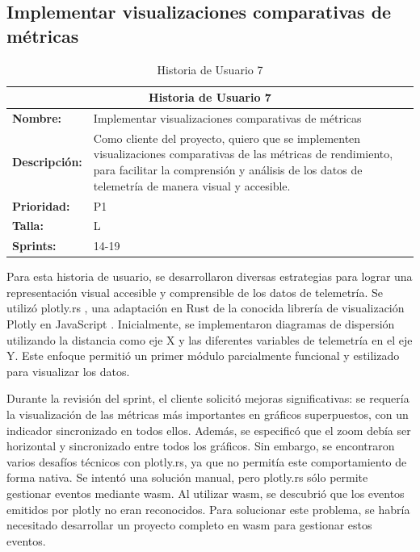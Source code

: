 \subsection{Implementar visualizaciones comparativas de métricas}
\begin{table}[H]
\centering
\begin{tabular}{|l|p{10cm}|}
\hline
\multicolumn{2}{|c|}{\textbf{Historia de Usuario 7}} \\ \hline
\textbf{Nombre:} & Implementar visualizaciones comparativas de métricas \\ \hline
\textbf{Descripción:} & Como cliente del proyecto, quiero que se implementen visualizaciones comparativas de las métricas de rendimiento, para facilitar la comprensión y análisis de los datos de telemetría de manera visual y accesible. \\ \hline
\textbf{Prioridad:} & P1 \\ \hline
\textbf{Talla:} & L \\ \hline
\textbf{Sprints:} & 14-19 \\ \hline
\end{tabular}
\caption{Historia de Usuario 7}
\label{tab:metricas_rendimiento}
\end{table}

Para esta historia de usuario, se desarrollaron diversas estrategias para lograr una representación visual accesible y comprensible de los datos de telemetría. Se utilizó plotly.rs \cite{plotly}, una adaptación en Rust de la conocida librería de visualización Plotly en JavaScript \cite{plotly_js}. Inicialmente, se implementaron diagramas de dispersión utilizando la distancia como eje X y las diferentes variables de telemetría en el eje Y. Este enfoque permitió un primer módulo parcialmente funcional y estilizado para visualizar los datos.

Durante la revisión del sprint, el cliente solicitó mejoras significativas: se requería la visualización de las métricas más importantes en gráficos superpuestos, con un indicador sincronizado en todos ellos. Además, se especificó que el zoom debía ser horizontal y sincronizado entre todos los gráficos. Sin embargo, se encontraron varios desafíos técnicos con plotly.rs, ya que no permitía este comportamiento de forma nativa. Se intentó una solución manual, pero plotly.rs sólo permite gestionar eventos mediante \ac{wasm}. Al utilizar \ac{wasm}, se descubrió que los eventos emitidos por plotly no eran reconocidos. Para solucionar este problema, se habría necesitado desarrollar un proyecto completo en \ac{wasm} para gestionar estos eventos.

